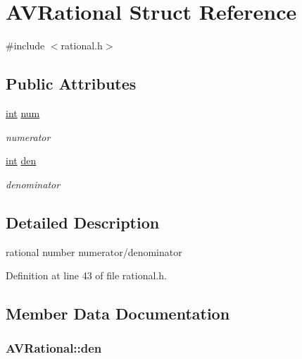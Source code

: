 \hypertarget{struct_a_v_rational}{}\section{A\+V\+Rational Struct Reference}
\label{struct_a_v_rational}


{\ttfamily \#include $<$rational.\+h$>$}

\subsection*{Public Attributes}
\begin{DoxyCompactItemize}
\item 
\hyperlink{xmltok_8h_a5a0d4a5641ce434f1d23533f2b2e6653}{int} \hyperlink{struct_a_v_rational_ae9a98c10a301c5e937095105b6f0fdb9}{num}
\begin{DoxyCompactList}\small\item\em numerator \end{DoxyCompactList}\item 
\hyperlink{xmltok_8h_a5a0d4a5641ce434f1d23533f2b2e6653}{int} \hyperlink{struct_a_v_rational_aee46bdac67d965ac0a4204e753f910c3}{den}
\begin{DoxyCompactList}\small\item\em denominator \end{DoxyCompactList}\end{DoxyCompactItemize}


\subsection{Detailed Description}
rational number numerator/denominator 

Definition at line 43 of file rational.\+h.



\subsection{Member Data Documentation}
\subsubsection[{\texorpdfstring{den}{den}}]{ A\+V\+Rational\+::den}\hypertarget{struct_a_v_rational_aee46bdac67d965ac0a4204e753f910c3}{}\label{struct_a_v_rational_aee46bdac67d965ac0a4204e753f910c3}


